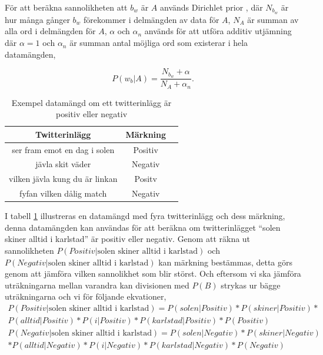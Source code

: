 \documentclass{kaumasters} %
\begin{document}
För att beräkna sannolikheten att $b_w$ är $A$ används Dirichlet prior \cite{wiki:012, nb:007}, där $N_{b_w}$ är hur många gånger $b_w$ förekommer i delmängden av data för $A$, $N_A$ är summan av alla ord i delmängden för $A$, $\alpha$ och $\alpha_n$ används för att utföra additiv utjämning \cite{wiki:013} där $\alpha = 1$ och $\alpha_n$ är summan antal möjliga ord som existerar i hela datamängden, 

\begin{equation}\label{eq:slut}
P(w_b|A)= \frac{N_{b_w} + \alpha}{N_A + \alpha_n}.
\end{equation}

\begin{table}
\centering
\caption{Exempel datamängd om ett twitterinlägg är positiv eller negativ}
\label{tab:dataset}
    \begin{tabular}{ccc}
    \toprule
    \textbf{Twitterinlägg} & \textbf{Märkning} \\
    \midrule
    ser fram emot en dag i solen & Positiv \\
    jävla skit väder & Negativ \\
    vilken jävla kung du är linkan & Positv \\
    fyfan vilken dålig match & Negativ \\
    \bottomrule
\end{tabular}
\end{table}

I tabell \ref{tab:dataset} illustreras en datamängd med fyra twitterinlägg och dess märkning, denna datamängden kan användas för att beräkna om twitterinlägget “solen skiner alltid i karlstad” är positiv eller negativ. Genom att räkna ut sannolikheten $P(Positiv|\textrm{solen skiner alltid i karlstad})$ och $P(Negativ|\textrm{solen skiner alltid i karlstad})$ kan märkning bestämmas, detta görs genom att jämföra vilken sannolikhet som blir störst. Och eftersom vi ska jämföra uträkningarna mellan varandra kan divisionen med $P(B)$ strykas ur bägge uträkningarna och vi för följande ekvationer,
\begin{multline*}
P(Positiv|\textrm{solen skiner alltid i karlstad}) = P(solen|Positiv) * P(skiner|Positiv) * \\P(alltid|Positiv) * P(i|Positiv) * P(karlstad|Positiv)*P(Positiv)
\end{multline*}
\begin{multline*}
P(Negativ|\textrm{solen skiner alltid i karlstad}) = P(solen|Negativ) * P(skiner|Negativ) \\ * P(alltid|Negativ) * P(i|Negativ) *  P(karlstad|Negativ) * P(Negativ)
\end{multline*}
\end{document}
